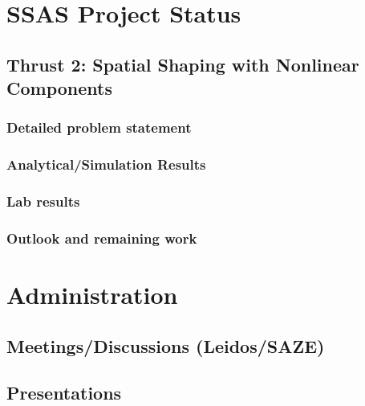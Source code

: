 
\section{SSAS Project Status}

\subsection{Thrust 2:  Spatial Shaping with Nonlinear Components}
\subsubsection{Detailed problem statement}
\subsubsection{Analytical/Simulation Results}
\subsubsection{Lab results}
\subsubsection{Outlook and remaining work}
%
%
%

\section{Administration}
\subsection{Meetings/Discussions (Leidos/SAZE)}
\subsection{Presentations}
